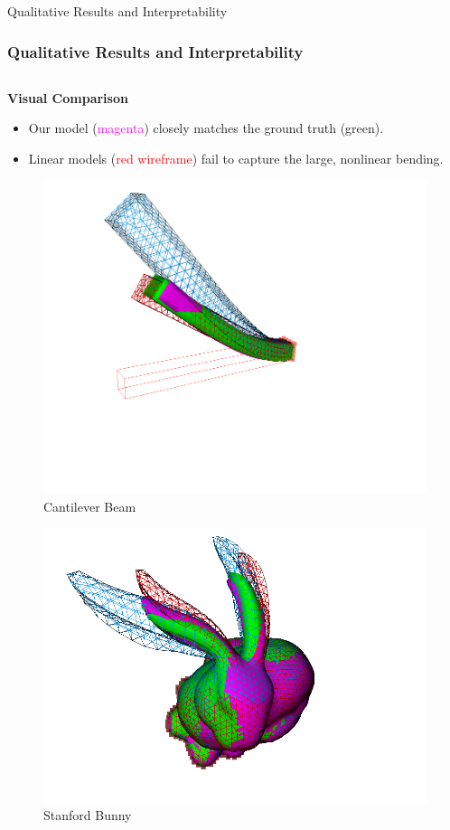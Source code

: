 \documentclass{beamer}
\begin{document}
\begin{frame}{Qualitative Results and Interpretability}
    \frametitle{Qualitative Results and Interpretability}
    
    \begin{columns}[T]
        \begin{column}{0.4\textwidth}
            \textbf{Visual Comparison}
            \begin{itemize}
                \item Our model (\textcolor{magenta}{magenta}) closely matches the ground truth (\textcolor{green!50!black}{green}).
                \item Linear models (\textcolor{red}{red wireframe}) fail to capture the large, nonlinear bending.
            \end{itemize}
            \begin{figure}
                \includegraphics[width=\textwidth]{Images/sofa_example_beam.png}
                \caption{Cantilever Beam}
            \end{figure}
            \begin{figure}
                \includegraphics[width=\textwidth]{Images/sofa_example_bunny.png}
                \caption{Stanford Bunny}
            \end{figure}
        \end{column}
        

\end{columns}
\end{frame}
\end{document}
